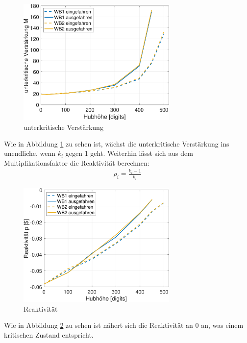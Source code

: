 \documentclass[12pt,german]{article}
\begin{document}
    \begin{figure}[H]
        \centering
        \includegraphics[width=0.7\textwidth]{unterkritischeVerstaerkung.png}
        \caption{unterkritische Verstärkung}
        \label{fig:unterkritVerst}
    \end{figure}
    Wie in Abbildung \ref{fig:unterkritVerst} zu sehen ist, wächst die unterkritische Verstärkung ins unendliche, wenn $k_i$ gegen 1 geht.
    \newpage
    Weiterhin lässt sich aus dem Multiplikationsfaktor die Reaktivität berechnen:
    \begin{align*}
        \rho_i = \frac{k_i - 1}{k_i}
    \end{align*}

    \begin{figure}[H]
        \centering
        \includegraphics[width=0.7\textwidth]{reaktivitaet.png}
        \caption{Reaktivität}
        \label{fig:reaktivitaet}
    \end{figure}
    Wie in Abbildung \ref{fig:reaktivitaet} zu sehen ist nähert sich die Reaktivität an 0 an, was einem kritischen Zustand entspricht.
\end{document}
